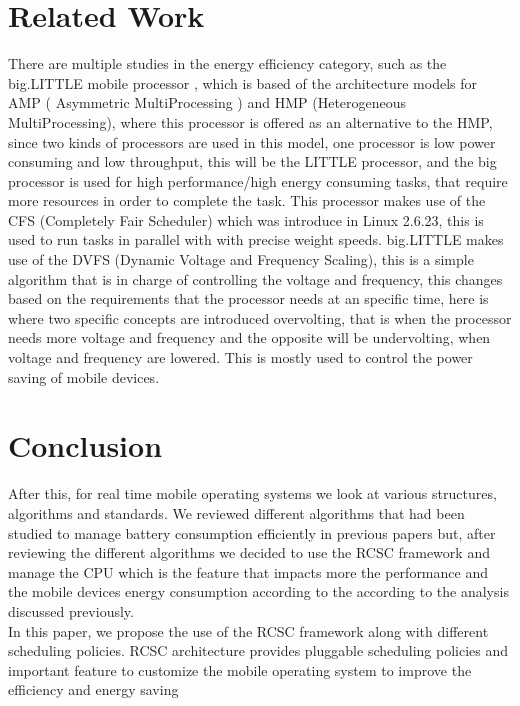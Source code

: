 \documentclass[conference]{IEEEtran}
\begin{document}
\section{Related Work}

There are multiple studies in the energy efficiency category, such as the big.LITTLE mobile processor \cite{KISO01}, which is based of the architecture models for AMP ( Asymmetric MultiProcessing ) and HMP (Heterogeneous MultiProcessing), where this processor is offered as an alternative to the HMP, since two kinds of processors are used in this model, one processor is low power consuming and low throughput, this will be the LITTLE processor, and the big processor is used for high performance/high energy consuming tasks, that require more resources in order to complete the task.
This processor makes use of the CFS (Completely Fair Scheduler) which was introduce in Linux 2.6.23, this is used to run tasks in parallel with with precise weight speeds. 
big.LITTLE makes use of the DVFS (Dynamic Voltage and Frequency Scaling), this is a simple algorithm that is in charge of controlling the voltage and frequency, this changes based on the requirements that the processor needs at an specific time, here is where two specific concepts are introduced overvolting, that is when the processor needs more voltage and frequency and the opposite will be undervolting, when voltage and frequency are lowered. This is mostly used to control the power saving of mobile devices. 

\section{Conclusion}
After this, for real time mobile operating systems we look at various structures, algorithms and standards. We reviewed different algorithms that had been studied to manage battery consumption efficiently  in previous papers but, after reviewing the different algorithms we decided to use the RCSC framework and manage the CPU which is the feature that impacts more the performance and the mobile devices energy consumption according to the according to the analysis discussed previously. \\
In this paper, we propose the use of the RCSC framework along with different scheduling policies. RCSC architecture provides pluggable scheduling policies and important feature to customize the mobile operating system to improve the efficiency and energy saving

\nocite{*}



\end{document}
